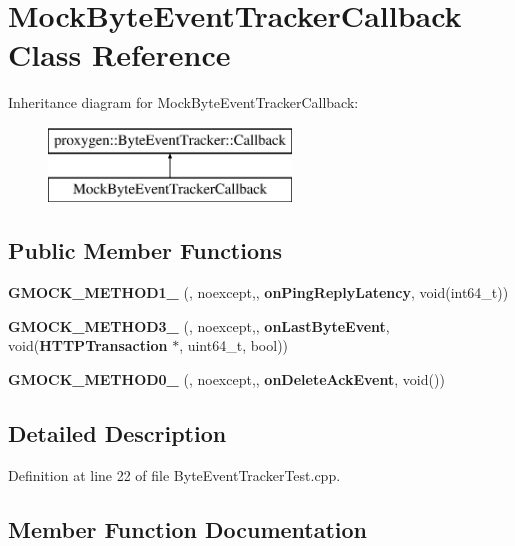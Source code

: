 \section{Mock\+Byte\+Event\+Tracker\+Callback Class Reference}
\label{classMockByteEventTrackerCallback}
Inheritance diagram for Mock\+Byte\+Event\+Tracker\+Callback\+:\begin{figure}[H]
\begin{center}
\leavevmode
\includegraphics[height=2.000000cm]{classMockByteEventTrackerCallback}
\end{center}
\end{figure}
\subsection*{Public Member Functions}
\begin{DoxyCompactItemize}
\item 
{\bf G\+M\+O\+C\+K\+\_\+\+M\+E\+T\+H\+O\+D1\+\_\+} (, noexcept,, {\bf on\+Ping\+Reply\+Latency}, void(int64\+\_\+t))
\item 
{\bf G\+M\+O\+C\+K\+\_\+\+M\+E\+T\+H\+O\+D3\+\_\+} (, noexcept,, {\bf on\+Last\+Byte\+Event}, void({\bf H\+T\+T\+P\+Transaction} $\ast$, uint64\+\_\+t, bool))
\item 
{\bf G\+M\+O\+C\+K\+\_\+\+M\+E\+T\+H\+O\+D0\+\_\+} (, noexcept,, {\bf on\+Delete\+Ack\+Event}, void())
\end{DoxyCompactItemize}


\subsection{Detailed Description}


Definition at line 22 of file Byte\+Event\+Tracker\+Test.\+cpp.



\subsection{Member Function Documentation}
